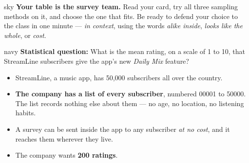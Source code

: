 \documentclass[12pt]{article}
\begin{document}
\clearpage
{}

\boxguard[10]
\begin{headlinebox}{sky}
\small
\textbf{Your table is the survey team.} Read your card, try all three sampling methods on it,
and choose the one that fits. Be ready to defend your choice to the class in one minute ---
\emph{in context}, using the words \emph{alike inside}, \emph{looks like the whole}, or
\emph{cost}.
\end{headlinebox}

\vspace{0.08in}

\boxguard[12]
\begin{scenariobox}{navy}
\small
\textbf{Statistical question:} What is the mean rating, on a scale of 1 to 10, that StreamLine
subscribers give the app's new \emph{Daily Mix} feature?
\begin{itemize}[leftmargin=1.3em, itemsep=2pt, topsep=4pt]
  \item StreamLine, a music app, has 50{,}000 subscribers all over the country.
  \item \textbf{The company has a list of every subscriber}, numbered 00001 to 50000. The list
        records nothing else about them --- no age, no location, no listening habits.
  \item A survey can be sent inside the app to any subscriber \emph{at no cost}, and it reaches
        them wherever they live.
  \item The company wants \textbf{200 ratings}.
\end{itemize}
\end{scenariobox}

\vspace{0.08in}
\end{document}

